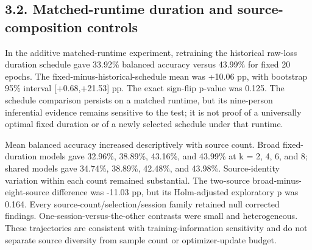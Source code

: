 \documentclass[11pt]{article}
\begin{document}
\subsection*{3.2. Matched-runtime duration and source-composition controls}
In the additive matched-runtime experiment, retraining the historical raw-loss duration schedule gave 33.92\% balanced accuracy versus 43.99\% for fixed 20 epochs. The fixed-minus-historical-schedule mean was +10.06 pp, with bootstrap 95\% interval [+0.68,+21.53] pp. The exact sign-flip p-value was 0.125. The schedule comparison persists on a matched runtime, but its nine-person inferential evidence remains sensitive to the test; it is not proof of a universally optimal fixed duration or of a newly selected schedule under that runtime.

Mean balanced accuracy increased descriptively with source count. Broad fixed-duration models gave 32.96\%, 38.89\%, 43.16\%, and 43.99\% at k = 2, 4, 6, and 8; shared models gave 34.74\%, 38.89\%, 42.48\%, and 43.98\%. Source-identity variation within each count remained substantial. The two-source broad-minus-eight-source difference was -11.03 pp, but its Holm-adjusted exploratory p was 0.164. Every source-count/selection/session family retained null corrected findings. One-session-versus-the-other contrasts were small and heterogeneous. These trajectories are consistent with training-information sensitivity and do not separate source diversity from sample count or optimizer-update budget.
\end{document}

